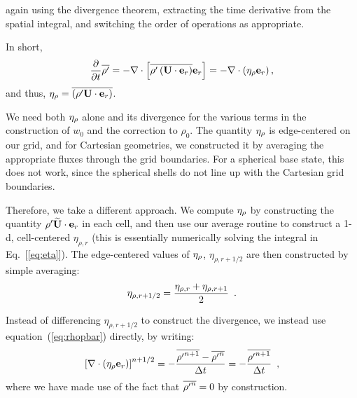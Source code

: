 again using the divergence theorem, extracting the time derivative from the spatial integral,
and switching the order of operations as appropriate.

In short, 
\begin{equation}
\frac{\partial}{\partial t} \overline{\rho'} = - \nabla\cdot\left[\overline{\rho'\left({\bf U}\cdot{\bf e}_r\right)}{\bf e}_r\right] = -\nabla\cdot\left(\eta_{\rho}{\bf e}_r\right), \label{eq:rhopbar}
\end{equation} 
and thus, $\eta_{\rho} = \overline{\left(\rho'{\bf U}\cdot{\bf e}_r\right)}$.

We need both $\eta_{\rho}$ alone and its divergence for the
various terms in the construction of $w_0$ and the correction to
$\rho_0$.  The quantity $\eta_{\rho}$ is edge-centered on our grid, and
for Cartesian geometries, we constructed it by averaging the
appropriate fluxes through the grid boundaries.  For a spherical base
state, this does not work, since the spherical shells do not line up
with the Cartesian grid boundaries.

Therefore, we take a different approach.  We compute $\eta_{\rho}$ by
constructing the quantity ${\rho^{\prime}} \widetilde{{\bf U}} \cdot \mathbf{e}_r$ in each cell, and then
use our average routine to construct a 1-d, cell-centered
$\eta_{\rho,r}$ (this is essentially numerically solving the integral
in Eq.~[\ref{eq:eta}]).  The edge-centered values of $\eta_{\rho}$,
$\eta_{\rho,r+1/2}$ are then constructed by simple
averaging: 
\begin{equation}
\eta_{\rho,r+1/2} = \frac{\eta_{\rho,r} + \eta_{\rho,r+1}}{2} \enskip .
\end{equation}

Instead of differencing $\eta_{\rho,r+1/2}$ to construct the 
divergence, we instead use equation~(\ref{eq:rhopbar}) directly, by writing:
\begin{equation}
\left [ \nabla \cdot (\eta_{\rho} \mathbf{e}_r ) \right ]^{n+1/2}
= - \frac{\overline{{\rho^{\prime}}^{n+1}} - \overline{{\rho^{\prime}}^n}}{\Delta t}
= - \frac{\overline{{\rho^{\prime}}^{n+1}}}{\Delta t} \enskip ,
\end{equation}
where we have made use of the fact that $\overline{{\rho^{\prime}}^n} = 0$ by construction.


